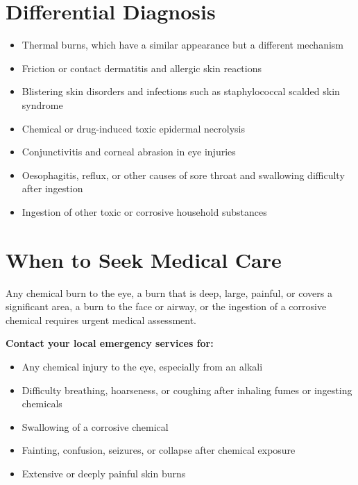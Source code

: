 \section*{Differential Diagnosis}
\begin{itemize}
    \item Thermal burns, which have a similar appearance but a different mechanism
    \item Friction or contact dermatitis and allergic skin reactions
    \item Blistering skin disorders and infections such as staphylococcal scalded skin syndrome
    \item Chemical or drug-induced toxic epidermal necrolysis
    \item Conjunctivitis and corneal abrasion in eye injuries
    \item Oesophagitis, reflux, or other causes of sore throat and swallowing difficulty after ingestion
    \item Ingestion of other toxic or corrosive household substances
\end{itemize}

\section*{When to Seek Medical Care}
Any chemical burn to the eye, a burn that is deep, large, painful, or covers a significant area, a burn to the face or airway, or the ingestion of a corrosive chemical requires urgent medical assessment.

\medskip
\textbf{Contact your local emergency services for:}
\begin{itemize}
    \item Any chemical injury to the eye, especially from an alkali
    \item Difficulty breathing, hoarseness, or coughing after inhaling fumes or ingesting chemicals
    \item Swallowing of a corrosive chemical
    \item Fainting, confusion, seizures, or collapse after chemical exposure
    \item Extensive or deeply painful skin burns
\end{itemize}

